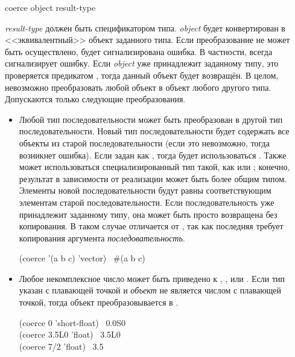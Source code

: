 \begin{defun}[Функция]
coerce object result-type

\emph{result-type} должен быть спецификатором типа. \emph{object} будет
конвертирован в <<эквивалентный>> объект заданного типа.
Если преобразование не может быть осуществлено, будет сигнализирована ошибка.
В частности,  всегда сигнализирует ошибку.
Если \emph{object} уже принадлежит заданному типу, это проверяется предикатом
, тогда данный объект будет возвращён.
В целом, невозможно преобразовать любой объект в объект любого другого
типа. Допускаются только следующие преобразования.
\begin{itemize}
\item
  Любой тип последовательности может быть преобразован в другой тип
  последовательности. Новый тип последовательности будет содержать все
  объекты из старой последовательности (если это невозможно, тогда возникнет
  ошибка). Если  задан как , тогда будет использоваться
  . Также может использоваться специализированный тип такой, как
   или ; конечно, результат в
  зависимости от реализации может быть более общим типом.
  Элементы новой последовательности будут равны  соответствующим
  элементам старой последовательности.
  Если последовательность уже принадлежит заданному типу, она может быть просто
  возвращена без копирования. В таком случае  отличается от , так как последняя требует
  копирования аргумента \emph{последовательность}.

  \begin{lisp}
    (coerce '(a b c) 'vector) \EV\ \#(a b c)
  \end{lisp}
\end{itemize}

\begin{itemize}
\item
  Любое некомплексное число может быть приведено к ,
  ,  или . Если тип указан с
  плавающей точкой и \emph{объект} не является числом с плавающей точкой, тогда
  объект преобразовывается в .

  \begin{lisp}
    (coerce 0 'short-float) \EV\ 0.0S0 \\
    (coerce 3.5L0 'float) \EV\ 3.5L0 \\
    (coerce 7/2 'float) \EV\ 3.5
  \end{lisp}


\end{itemize}
\end{defun}
